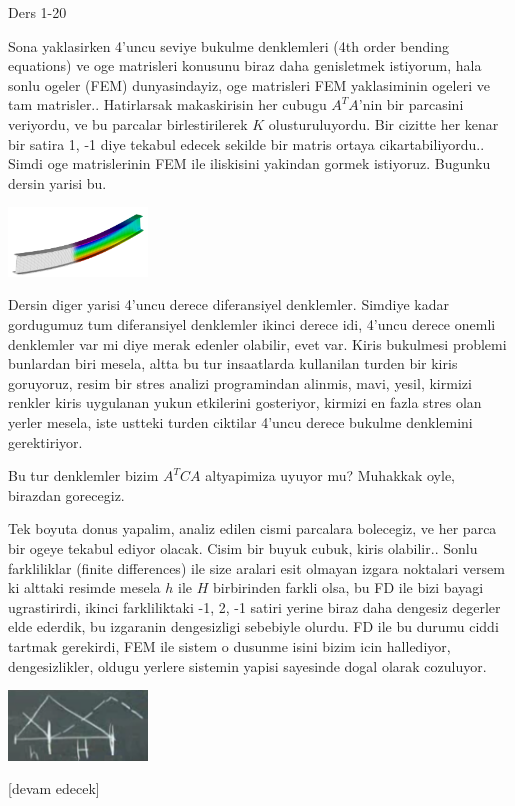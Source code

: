 \documentclass[12pt,fleqn]{article}\usepackage{../../common}
\begin{document}
Ders 1-20

Sona yaklasirken 4'uncu seviye bukulme denklemleri (4th order bending equations)
ve oge matrisleri konusunu biraz daha genisletmek istiyorum, hala sonlu ogeler
(FEM) dunyasindayiz, oge matrisleri FEM yaklasiminin ogeleri ve tam
matrisler.. Hatirlarsak makaskirisin her cubugu $A^T A$'nin bir parcasini
veriyordu, ve bu parcalar birlestirilerek $K$ olusturuluyordu. Bir cizitte her
kenar bir satira 1, -1 diye tekabul edecek sekilde bir matris ortaya
cikartabiliyordu.. Simdi oge matrislerinin FEM ile iliskisini yakindan gormek
istiyoruz. Bugunku dersin yarisi bu.

\includegraphics[width=10em]{compscieng_1_20_01.png}

Dersin diger yarisi 4'uncu derece diferansiyel denklemler. Simdiye kadar
gordugumuz tum diferansiyel denklemler ikinci derece idi, 4'uncu derece onemli
denklemler var mi diye merak edenler olabilir, evet var. Kiris bukulmesi
problemi bunlardan biri mesela, altta bu tur insaatlarda kullanilan turden bir
kiris goruyoruz, resim bir stres analizi programindan alinmis, mavi, yesil,
kirmizi renkler kiris uygulanan yukun etkilerini gosteriyor, kirmizi en fazla
stres olan yerler mesela, iste ustteki turden ciktilar 4'uncu derece bukulme
denklemini gerektiriyor.

Bu tur denklemler bizim $A^T C A$ altyapimiza uyuyor mu? Muhakkak oyle,
birazdan gorecegiz. 

Tek boyuta donus yapalim, analiz edilen cismi parcalara bolecegiz, ve her parca
bir ogeye tekabul ediyor olacak. Cisim bir buyuk cubuk, kiris olabilir..  Sonlu
farkliliklar (finite differences) ile size aralari esit olmayan izgara noktalari
versem ki alttaki resimde mesela $h$ ile $H$ birbirinden farkli olsa, bu FD ile
bizi bayagi ugrastirirdi, ikinci farkliliktaki -1, 2, -1 satiri yerine biraz
daha dengesiz degerler elde ederdik, bu izgaranin dengesizligi sebebiyle
olurdu. FD ile bu durumu ciddi tartmak gerekirdi, FEM ile sistem o dusunme isini
bizim icin hallediyor, dengesizlikler, oldugu yerlere sistemin yapisi
sayesinde dogal olarak cozuluyor. 

\includegraphics[width=10em]{compscieng_1_20_02.png}



















[devam edecek]
\end{document}
